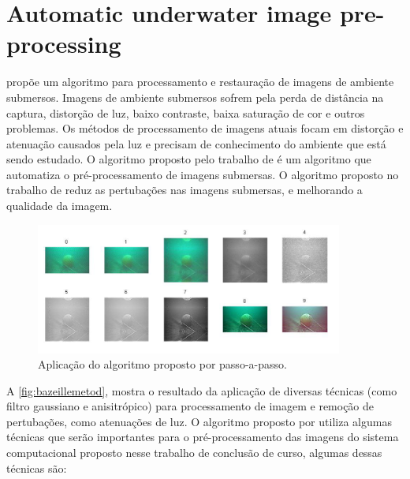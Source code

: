\section{Automatic underwater image pre-processing}

 propõe um algoritmo para processamento e restauração de imagens de ambiente submersos.  Imagens de ambiente submersos sofrem pela perda de distância na captura, distorção de luz, baixo contraste, baixa saturação de cor e outros problemas. Os métodos de processamento de imagens atuais focam em distorção e atenuação causados pela luz e precisam de conhecimento do ambiente que está sendo estudado. O algoritmo proposto pelo trabalho de  é um algoritmo que automatiza o pré-processamento de imagens submersas. O algoritmo proposto no trabalho de  reduz as pertubações nas imagens submersas, e melhorando a qualidade da imagem.


\begin{figure}[h]
	\caption{\label{fig:bazeillemetod}Aplicação do algoritmo proposto por \cite{bazeille2006} passo-a-passo.}
	\begin{center}
	    \includegraphics[width=0.9\textwidth]{resources/bazeilemetod}
	\end{center}
\end{figure}

A \autoref{fig:bazeillemetod}, mostra o resultado da aplicação de diversas técnicas (como filtro gaussiano e anisitrópico) para processamento de imagem e remoção de pertubações, como atenuações de luz.
% 
O algoritmo proposto por \cite{bazeille2006} utiliza algumas técnicas que serão importantes para o pré-processamento das imagens do sistema computacional proposto nesse trabalho de conclusão de curso, algumas dessas técnicas são:

